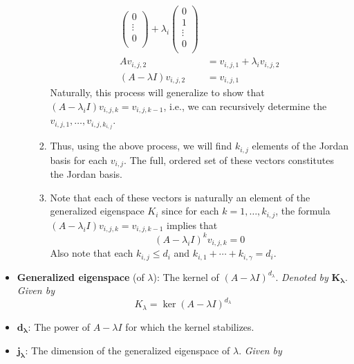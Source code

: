 \documentclass[../notes.tex]{subfiles}
\begin{document}
\begin{itemize}
\begin{enumerate}
\begin{enumerate}
\begin{align*}
\begin{pmatrix}
                    0\\
                    \vdots\\
                    0\\
                \end{pmatrix}
                +\lambda_i
                \begin{pmatrix}
                    0\\
                    1\\
                    \vdots\\
                    0\\
                \end{pmatrix}\\
                Av_{i,j,2} &= v_{i,j,1}+\lambda_iv_{i,j,2}\\
                (A-\lambda I)v_{i,j,2} &= v_{i,j,1}
            \end{align*}
            Naturally, this process will generalize to show that $(A-\lambda_iI)v_{i,j,k}=v_{i,j,k-1}$, i.e., we can recursively determine the $v_{i,j,1},\dots,v_{i,j,k_{i,j}}$.
            \item Thus, using the above process, we will find $k_{i,j}$ elements of the Jordan basis for each $v_{i,j}$. The full, ordered set of these vectors constitutes the Jordan basis.
            \item Note that each of these vectors is naturally an element of the generalized eigenspace $K_i$ since for each $k=1,\dots,k_{i,j}$, the formula $(A-\lambda_iI)v_{i,j,k}=v_{i,j,k-1}$ implies that
            \begin{equation*}
                (A-\lambda_iI)^kv_{i,j,k} = 0
            \end{equation*}
            Also note that each $k_{i,j}\leq d_i$ and $k_{i,1}+\cdots+k_{i,\gamma}=d_i$.
        \end{enumerate}
    \end{enumerate}
    \item \textbf{Generalized eigenspace} (of $\lambda$): The kernel of $(A-\lambda I)^{d_\lambda}$. \emph{Denoted by} $\bm{K_\lambda}$. \emph{Given by}
    \begin{equation*}
        K_\lambda = \ker(A-\lambda I)^{d_\lambda}
    \end{equation*}
    \item $\bm{d_\lambda}$: The power of $A-\lambda I$ for which the kernel stabilizes.
    \item $\bm{j_\lambda}$: The dimension of the generalized eigenspace of $\lambda$. \emph{Given by}

\end{itemize}
\end{document}
